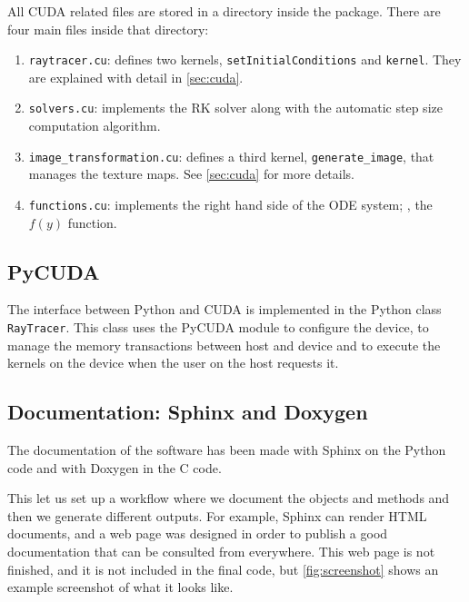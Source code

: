 All \ac{CUDA} related files are stored in a directory inside the package. There are four main files inside that directory:
\begin{enumerate}
	\item \lstinline{raytracer.cu}: defines two kernels, \lstinline{setInitialConditions} and \lstinline{kernel}. They are explained with detail in \autoref{sec:cuda}.
	\item \lstinline{solvers.cu}: implements the \ac{RK} solver along with the automatic step size computation algorithm.
	\item \lstinline{image_transformation.cu}: defines a third kernel, \lstinline{generate_image}, that manages the texture maps. See \autoref{sec:cuda} for more details.
	\item \lstinline{functions.cu}: implements the right hand side of the \ac{ODE} system; \ie, the $f(y)$ function.
\end{enumerate}

\subsection{PyCUDA}

The interface between Python and \ac{CUDA} is implemented in the Python class \lstinline{RayTracer}. This class uses the PyCUDA module to configure the device, to manage the memory transactions between host and device and to execute the kernels on the device when the user on the host requests it.

\subsection{Documentation: Sphinx and Doxygen}

The documentation of the software has been made with Sphinx on the Python code and with Doxygen in the C code.

This let us set up a workflow where we document the objects and methods and then we generate different outputs. For example, Sphinx can render HTML documents, and a web page was designed in order to publish a good documentation that can be consulted from everywhere. This web page is not finished, and it is not included in the final code, but \autoref{fig:screenshot} shows an example screenshot of what it looks like.

